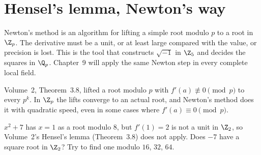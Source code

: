 \section{Hensel's lemma, Newton's way}

Newton's method is an algorithm for lifting a simple root modulo $p$ to a root in $\Z_p$. The derivative must be a unit, or at least large compared with the value, or precision is lost. This is the tool that constructs $\sqrt{-1}$ in $\Z_5$ and decides the squares in $\Q_p$. Chapter~9 will apply the same Newton step in every complete local field.

Volume~2, Theorem~3.8, lifted a root modulo $p$ with $f'(a)\not\equiv0\pmod p$ to every $p^k$. In $\Z_p$ the lifts converge to an actual root, and Newton's method does it with quadratic speed, even in some cases where $f'(a)\equiv0\pmod p$.

\begin{think}
$x^2+7$ has $x=1$ as a root modulo $8$, but $f'(1)=2$ is not a unit in $\Z_2$, so Volume~2's Hensel's lemma (Theorem~3.8) does not apply. Does $-7$ have a square root in $\Z_2$? Try to find one modulo $16$, $32$, $64$.
\end{think}

